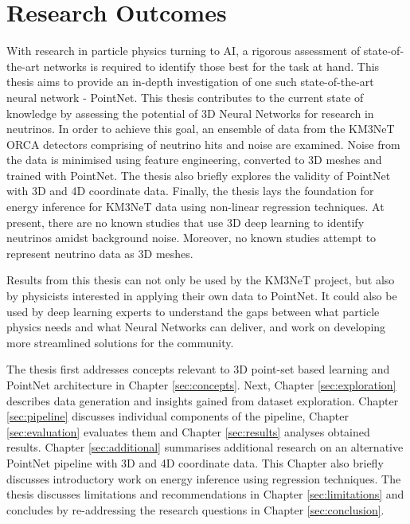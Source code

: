 \section{Research Outcomes}
With research in particle physics turning to AI, a rigorous assessment of state-of-the-art networks is required to identify those best for the task at hand. This thesis aims to provide an in-depth investigation of one such state-of-the-art neural network - PointNet.  This thesis contributes to the current state of knowledge by assessing the potential of 3D Neural Networks for research in neutrinos. In order to achieve this goal, an ensemble of data from the KM3NeT ORCA detectors comprising of neutrino hits and noise are examined. Noise from the data is minimised using feature engineering,  converted to 3D meshes and trained with PointNet. The thesis also briefly explores the validity of PointNet with 3D and 4D coordinate data. Finally, the thesis lays the foundation for energy inference for KM3NeT data using non-linear regression techniques. At present, there are no known studies that use 3D deep learning to identify neutrinos amidst background noise. Moreover, no known studies attempt to represent neutrino data as 3D meshes. 

Results from this thesis can not only be used by the KM3NeT project, but also by physicists interested in applying their own data to PointNet. It could also be used by deep learning experts to understand the gaps between what particle physics needs and what Neural Networks can deliver, and work on developing more streamlined solutions for the community. 

The thesis first addresses concepts relevant to 3D point-set based learning and PointNet architecture in Chapter \ref{sec:concepts}. Next, Chapter \ref{sec:exploration} describes data generation and insights gained from dataset exploration. Chapter \ref{sec:pipeline} discusses individual components of the pipeline, Chapter \ref{sec:evaluation} evaluates them and Chapter \ref{sec:results} analyses obtained results. Chapter \ref{sec:additional} summarises additional research on an alternative PointNet pipeline with 3D and 4D coordinate data. This Chapter also briefly discusses introductory work on energy inference using regression techniques. The thesis discusses limitations and recommendations in Chapter  \ref{sec:limitations} and concludes by re-addressing the research questions in Chapter \ref{sec:conclusion}. 

\let\cleardoublepage\clearpage